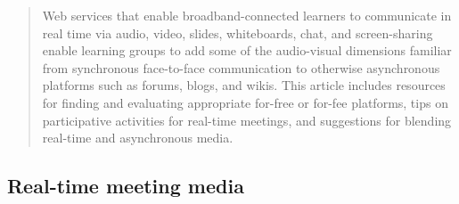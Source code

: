 %
\begin{quote}
Web services that enable broadband-connected learners to communicate
in real time via audio, video, slides, whiteboards, chat, and
screen-sharing enable learning groups to add some of the audio-visual
dimensions familiar from synchronous face-to-face communication to
otherwise asynchronous platforms such as forums, blogs, and
wikis. This article includes resources for finding and evaluating
appropriate for-free or for-fee platforms, tips on participative
activities for real-time meetings, and suggestions for blending
real-time and asynchronous media.
\end{quote}

\subsection{Real-time meeting media}

